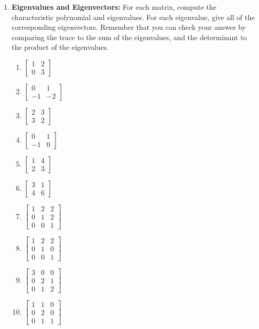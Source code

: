 \begin{enumerate}
\item \textbf{Eigenvalues and Eigenvectors:} For each matrix, compute
  the characteristic polynomial and eigenvalues. For each eigenvalue,
  give all of the corresponding eigenvectors. Remember that you can check your answer by comparing the trace to the sum of the eigenvalues, and the determinant to the product of the eigenvalues.
\begin{multicols}{4}
\begin{enumerate}
	\item 
$
\begin{bmatrix}
 1 & 2 \\
 0 & 3
\end{bmatrix}
$
	\item 
$
\begin{bmatrix}
 0 & 1 \\
 -1 & -2
\end{bmatrix}
$
	\item 
$
\begin{bmatrix}
 2 & 3 \\
 3 & 2
\end{bmatrix}
$
	\item 
$
\begin{bmatrix}
 0 & 1 \\
 -1 & 0
\end{bmatrix}
$
	\item 
$
\begin{bmatrix}
 1 & 4 \\
 2 & 3
\end{bmatrix}
$
	\item 
$
\begin{bmatrix}
 3 & 1 \\
 4 & 6
\end{bmatrix}
$
	\item 
$
\begin{bmatrix}
 1 & 2 & 2 \\
 0 & 1 & 2 \\
 0 & 0 & 1
\end{bmatrix}
$
	\item 
$
\begin{bmatrix}
 1 & 2 & 2 \\
 0 & 1 & 0 \\
 0 & 0 & 1
\end{bmatrix}
$
	\item 
$
\begin{bmatrix}
 3 & 0 & 0 \\
 0 & 2 & 1 \\
 0 & 1 & 2
\end{bmatrix}
$
	\item 
$
\begin{bmatrix}
 1 & 1 & 0 \\
 0 & 2 & 0 \\
 0 & 1 & 1
\end{bmatrix}
$
\end{enumerate}
\end{multicols}
 

\end{enumerate}
